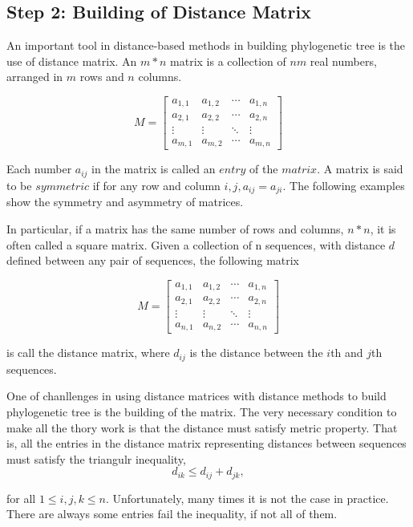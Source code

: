 \subsection{Step 2: Building of Distance Matrix} \label{phase2}
An important tool in distance-based methods in building phylogenetic 
tree is the use of distance matrix. An $m*n$ matrix is a collection 
of $nm$ real numbers, arranged in $m$ rows and $n$ columns.

\[
M = \begin{bmatrix}
	a_{1,1} & a_{1,2} & \cdots & a_{1,n} \\
  	a_{2,1} & a_{2,2} & \cdots & a_{2,n} \\
  	\vdots  & \vdots  & \ddots & \vdots  \\
  	a_{m,1} & a_{m,2} & \cdots & a_{m,n}
\end{bmatrix}
\]

Each number $a_{ij}$ in the matrix is called an $entry$ of the $matrix$. 
A matrix is said to be $symmetric$ if for any row and column 
$i,j, a_{ij} = a_{ji}$. The following examples show the 
symmetry and asymmetry of matrices.

In particular, if a matrix has the same number of rows 
and columns, $n*n$, it is often called a square matrix. 
Given a collection of n sequences, with distance $d$ defined 
between any pair of sequences, the following matrix

\[
M = \begin{bmatrix}
	a_{1,1} & a_{1,2} & \cdots & a_{1,n} \\
  	a_{2,1} & a_{2,2} & \cdots & a_{2,n} \\
  	\vdots  & \vdots  & \ddots & \vdots  \\
  	a_{n,1} & a_{n,2} & \cdots & a_{n,n}
\end{bmatrix}
\]

is call the distance matrix, where $d_{ij}$ is the distance 
between the $i$th and $j$th sequences.

One of chanllenges in using distance matrices with distance 
methods to build phylogenetic tree is the building of the matrix. 
The very necessary condition to make all the thory work is that 
the distance must satisfy metric property. That is, all the 
entries in the distance matrix representing distances between 
sequences must satisfy the triangulr inequality,
\[
d_{ik} \leq d_{ij} + d_{jk},
\]

for all $1 \leq i,j,k \leq n$. Unfortunately, many times 
it is not the case in practice. There are always some 
entries fail the inequality, if not all of them.

